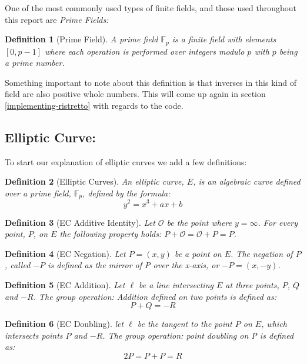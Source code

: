 \documentclass{article}
\newtheorem{definition}{Definition}[section]
\renewcommand{\O}{\mathcal{O}}
\newcommand{\F}{\mathbb{F}}
\begin{document}
One of the most commonly used types of finite fields, and those used
throughout this report are \textit{Prime Fields:} 

\begin{definition}[Prime Field]
	A prime field $\F_p$ is a finite field with elements $[0,p-1]$
	where each operation is performed over integers modulo $p$ with $p$ being a prime number.
\end{definition}

Something important to note about this definition is that inverses in
this kind of field are also positive whole numbers. This will come up
again in section \ref{implementing-ristretto} with regards to the code.

\subsection{Elliptic Curve:}\label{elliptic-curves}

To start our explanation of elliptic curves we add a few definitions:

\begin{definition}[Elliptic Curves]
	An elliptic curve, $E$, is an algebraic curve defined over a prime field, $\F_p$, defined by the formula:
	$$y^2 = x^3 + ax + b$$
\end{definition}

\begin{definition}[EC Additive Identity]
	Let $\O$ be the point where $y = \infty$. For every point, $P$,
	on $E$ the following property holds:
	$P + \O = \O + P = P$.
\end{definition}

\begin{definition}[EC Negation]
	Let $P = (x,y)$ be a point on $E$. The negation of $P$, called $-P$
	is defined as the mirror of P over the x-axis, or $-P = (x,-y)$.
\end{definition}

\begin{definition}[EC Addition]
	Let $\ell$ be a line intersecting $E$ at three points, $P$, $Q$ and
	$-R$. The group operation: Addition defined on two points is defined
	as:
	$$P + Q = {-R}$$
\end{definition}

\begin{definition}[EC Doubling]
	let $\ell$ be the tangent to the point $P$ on $E$, which intersects
	points $P$ and $-R$. The group operation: point doubling on P is
	defined as:
	$$2P = P + P = R$$
\end{definition}
\end{document}
